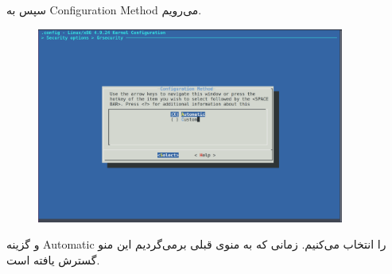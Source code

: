 \documentclass{article}
\begin{document}
\begin{enumerate}
سپس به Configuration Method می‌رویم.
\begin{figure}[ht]
	\centering	
	\includegraphics[width = 0.9\textwidth]{images/4.png}
\end{figure}

و گزینه Automatic را انتخاب می‌کنیم. زمانی که به منوی قبلی برمی‌گردیم این منو گسترش یافته است.


\end{enumerate}
\end{document}

